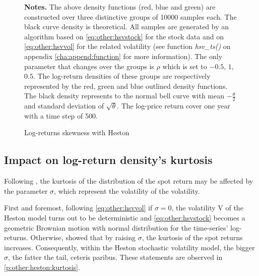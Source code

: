 \documentclass[12pt,a4paper]{report}
\begin{document}
\begin{figure}[ht]
\centering

\caption{Log-returns skewness with Heston}
  \begin{changemargin}{0.5cm}{0.5cm}
  \medskip
\footnotesize
{}\textbf{Notes.} The above density functions (red, blue and green) are constructed over three distinctive groups of 10000 samples each. The black curve density is theoretical.
All samples are generated by an algorithm based on \cref{eq:other:hsvstock} for the stock data and on \cref{eq:other:hsvvol} for the related volatility (see function \textit{hsv\_ts()} on appendix \ref{cha:append:function} for more information).
The only parameter that changes over the groups is $\rho$ which is set to $-0.5$, $1$, $0.5$. The log-return densities of these groups are respectively represented by the red, green and blue outlined density functions. 
The black density represents to the normal bell curve with mean $- \frac{\theta}{2}$ and standard deviation of $\sqrt{\theta}$. The log-price return cover one year with a time step of 500.  
\end{changemargin}
\label{p:other:heston:skewness}
\end{figure}

\subsection{Impact on log-return density's kurtosis}
\label{sub:hestonkurtosis}

Following \citet{heston1993}, the kurtosis of the distribution of the spot return may be affected by the parameter $\sigma$, which represent the volatility of the volatility.

First and foremost, following \cref{eq:other:hsvvol} if $\sigma = 0$, the volatility V of the Heston model turns out to be deterministic and \cref{eq:other:hsvstock}  becomes a geometric Brownian motion with normal distribution for the time-series' log-returns.
Otherwise, \citet{heston1993} showed that by raising $\sigma$, the kurtosis of the spot returns increases. Consequently, within the Heston stochastic volatility model, the bigger $\sigma$, the fatter the tail, ceteris paribus. These statements are observed in \cref{p:other:heston:kurtosis}.
\end{document}
